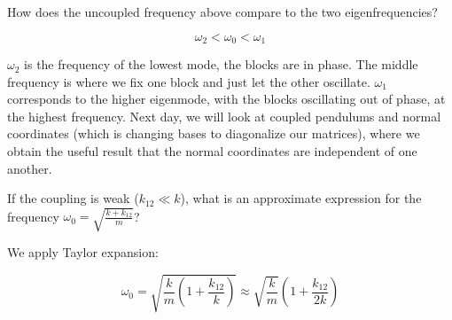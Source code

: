\begin{p}
How does the uncoupled frequency above compare to the two eigenfrequencies?
\end{p}
\begin{s}
\[\omega_2 < \omega_0 < \omega_1\]
\end{s}
\noindent$\omega_2$ is the frequency of the lowest mode, the blocks are in phase. The middle frequency is where we fix one block and just let the other oscillate. $\omega_1$ corresponds to the higher eigenmode, with the blocks oscillating out of phase, at the highest frequency. Next day, we will look at coupled pendulums and normal coordinates (which is changing bases to diagonalize our matrices), where we obtain the useful result that the normal coordinates are independent of one another.

\begin{p}
If the coupling is weak ($k_{12} \ll k$), what is an approximate expression for the frequency $\omega_0=\sqrt{\frac{k+k_{12}}{m}}$?
\end{p}
\begin{s}
We apply Taylor expansion:

\[ \omega_0=\sqrt{\frac{k}{m}\left(1+\frac{k_{12}}{k}\right)}\approx\sqrt{\frac{k}{m}}\left( 1+\frac{k_{12}}{2k} \right) \]
\end{s}